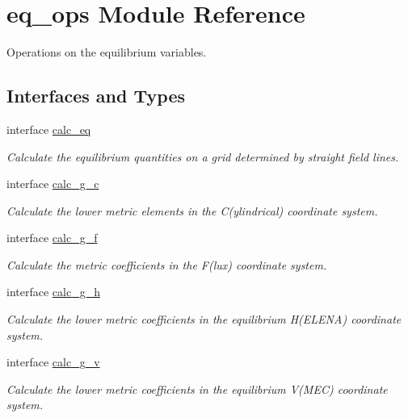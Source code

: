 \hypertarget{namespaceeq__ops}{}\section{eq\+\_\+ops Module Reference}
\label{namespaceeq__ops}


Operations on the equilibrium variables.  


\subsection*{Interfaces and Types}
\begin{DoxyCompactItemize}
\item 
interface \hyperlink{interfaceeq__ops_1_1calc__eq}{calc\+\_\+eq}
\begin{DoxyCompactList}\small\item\em Calculate the equilibrium quantities on a grid determined by straight field lines. \end{DoxyCompactList}\item 
interface \hyperlink{interfaceeq__ops_1_1calc__g__c}{calc\+\_\+g\+\_\+c}
\begin{DoxyCompactList}\small\item\em Calculate the lower metric elements in the C(ylindrical) coordinate system. \end{DoxyCompactList}\item 
interface \hyperlink{interfaceeq__ops_1_1calc__g__f}{calc\+\_\+g\+\_\+f}
\begin{DoxyCompactList}\small\item\em Calculate the metric coefficients in the F(lux) coordinate system. \end{DoxyCompactList}\item 
interface \hyperlink{interfaceeq__ops_1_1calc__g__h}{calc\+\_\+g\+\_\+h}
\begin{DoxyCompactList}\small\item\em Calculate the lower metric coefficients in the equilibrium H(\+E\+L\+E\+N\+A) coordinate system. \end{DoxyCompactList}\item 
interface \hyperlink{interfaceeq__ops_1_1calc__g__v}{calc\+\_\+g\+\_\+v}
\begin{DoxyCompactList}\small\item\em Calculate the lower metric coefficients in the equilibrium V(\+M\+E\+C) coordinate system. \end{DoxyCompactList}\item 

\end{DoxyCompactItemize}
